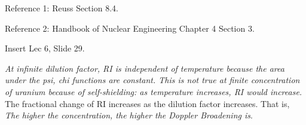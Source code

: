 \documentclass{school-22.211-notes}
\begin{document}
Reference 1: Reuss Section 8.4. 

Reference 2: Handbook of Nuclear Engineering Chapter 4 Section 3. 


Insert Lec 6, Slide 29. 

\textit{At infinite dilution factor, RI is independent of temperature because the area under the psi, chi functions are constant. This is not true at finite concentration of uranium because of self-shielding: as temperature increases, RI would increase.} The fractional change of RI increases as the dilution factor increases. That is, \textit{The higher the concentration, the higher the Doppler Broadening is}. 
\end{document}
